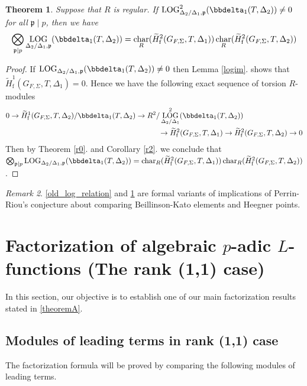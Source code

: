 \documentclass[10pt]{amsart}
\numberwithin{equation}{section}
\newtheorem{thm}{Theorem}[section]
\theoremstyle{definition}
\theoremstyle{remark} %
\newtheorem{rmk}[thm]{Remark}
\DeclareMathOperator{\Char}{char}
\DeclareMathOperator{\LOG}{LOG}
\newcommand{\p}{\mathfrak{p}}
\begin{document}
		
		\begin{thm}
			\label{logrln}
			Suppose that $R$ is regular. If $ \LOG^2_{\Delta_2/\Delta_1 , \p} (\bbdelta_1(T, \Delta_2)) \ne 0 $ for all $ \p \mid p $, then we have 
			$$ \bigotimes_{\p \mid p}  \LOG_{\Delta_2/\Delta_1 , \p} (\bbdelta_1(T, \Delta_2)) = \Char_R(\widetilde{H}^2_{\mathrm{f}}(G_{F,\Sigma},T,\Delta_1)) \Char_R(\widetilde{H}^2_{\mathrm{f}}(G_{F,\Sigma},T,\Delta_2)) $$
		\end{thm}
		\begin{proof}
			If $ \LOG_{\Delta_2/\Delta_1 , \p} (\bbdelta_1(T, \Delta_2)) \ne 0 $ then Lemma \ref{logim}. shows that $ \widetilde{H}^1_{\mathrm{f}}(G_{F,\Sigma},T,\Delta_1) = 0 $. Hence we have the following exact sequence of torsion $ R $-modules 
			\begin{align*}
				0 \rightarrow \widetilde{H}^1_{\mathrm{f}}(G_{F,\Sigma},T,\Delta_2)/ \bbdelta_1(T,\Delta_2) \rightarrow R^2/\LOG^2_{\Delta_2/\Delta_1}(\bbdelta_1(T,\Delta_2)) \qquad \qquad \qquad\qquad \\
				\rightarrow \widetilde{H}^2_{\mathrm{f}}(G_{F,\Sigma},T,\Delta_1) \rightarrow \widetilde{H}^2_{\mathrm{f}}(G_{F,\Sigma},T,\Delta_2) \rightarrow 0
			\end{align*} 
			Then by Theorem \ref{r0}. and Corollary \ref{r2}. we conclude that\\
			$\bigotimes_{\p \mid p}  \LOG_{\Delta_2/\Delta_1 , \p} (\bbdelta_1(T, \Delta_2)) = \Char_R(\widetilde{H}^2_{\mathrm{f}}(G_{F,\Sigma},T,\Delta_1)) \Char_R(\widetilde{H}^2_{\mathrm{f}}(G_{F,\Sigma},T,\Delta_2)) $.
		\end{proof}
		\begin{rmk}
			\cref{old_log_relation} and \cref{logrln} are formal variants of implications of Perrin-Riou's conjecture about comparing Beillinson-Kato elements and Heegner points.
		\end{rmk}
		
		
		
		
		
		
		
		
		\section{Factorization of algebraic $p$-adic $L$-functions (The rank (1,1) case)}
		\label{section : factorization_1}
		In this section, our objective is to establish one of our main factorization results stated in \cref{theoremA}. 
		\subsection{Modules of leading terms in rank (1,1) case}
		The factorization formula will be proved by comparing the following modules of leading terms.
\end{document}
